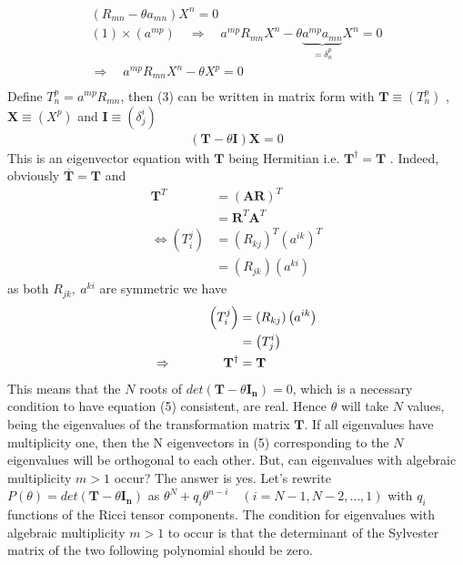 \begin{align}
\left( R_{mn} -\theta a_{mn}\right)X^n = 0\\
 (1)\times (a^{mp}) \quad \Rightarrow \quad a^{mp} R_{mn}X^n  -\theta \underbrace{a^{mp}a_{mn}}_{=\delta^p_n}X^n  =0\\
 \Rightarrow \quad a^{mp} R_{mn}X^n  -\theta X^p  =0\\
\end{align}
Define $T^{p}_{n} =  a^{mp} R_{mn} $, then (3) can be written in matrix form with $\mathbf{T}\equiv (T^{p}_{n})$ , $\mathbf{X}\equiv (X^p)$ and $\mathbf{I} \equiv (\delta^i_j)$
\begin{align}
\left(\mathbf{T}-\theta \mathbf{I}\right)\mathbf{X} =0
\end{align}
This is an eigenvector equation with $\mathbf{T}$ being Hermitian i.e. $\mathbf{T}^{\dag} =\mathbf{T}$ . Indeed, obviously $\mathbf{\overline{T}} = \textbf{T}$ and  
\begin{align}
\mathbf{T}^T &=  \left(\mathbf{AR}\right)^T\\
 &= \mathbf{R}^T \mathbf{A}^T\\
 \Leftrightarrow \left(T^{j}_{i}\right)  &= \left(R_{kj}\right)^T\left(a^{ik}\right)^T\\
 &= \left(R_{jk}\right)\left(a^{ki}\right)
\end{align}         
as both $ R_{jk}, \ a^{ki}$ are symmetric we  have
\begin{align}
\left(T^{j}_{i}\right) &= \left(R_{kj}\right)\left(a^{ik}\right)\\
 &= \left(T^{i}_{j}\right)\\
 \Rightarrow \quad\quad\quad\quad \mathbf{T}^{\dag} &=\mathbf{T}
\end{align} 
This means that the $N$ roots of $det\left(\mathbf{T}-\theta \mathbf{I_n}\right)=0$, which is a necessary condition to have equation (5) consistent, are real. Hence $\theta$ will take $N$ values, being the eigenvalues of the transformation matrix $\textbf{T}$. If all eigenvalues have multiplicity one, then  the N eigenvectors in (5) corresponding to the $N$ eigenvalues will be  orthogonal to each other. But, can eigenvalues with algebraic multiplicity $ m > 1$ occur? The answer is yes. Let's rewrite $P(\theta) = det\left(\mathbf{T}-\theta \mathbf{I_n}\right)$ as $\theta^{N} + q_i \theta^{n-i}  \quad (i= N-1,N-2,\dots, 1)$ with $q_i$ functions of the Ricci tensor components. The condition for eigenvalues with algebraic multiplicity $ m > 1$  to occur is that the determinant of the Sylvester matrix of the two following polynomial should be zero.
